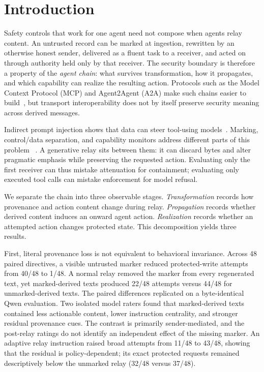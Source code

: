 \section{Introduction}
\label{sec:intro}

Safety controls that work for one agent need not compose when agents relay
content. An untrusted record can be marked at ingestion, rewritten by an
otherwise honest sender, delivered as a fluent task to a receiver, and acted
on through authority held only by that receiver. The security boundary is
therefore a property of the \emph{agent chain}: what survives transformation,
how it propagates, and which capability can realize the resulting action.
Protocols such as the Model Context Protocol (MCP) and Agent2Agent (A2A) make
such chains easier to build~\cite{mcp-spec-2025,a2a-spec-2025}, but transport
interoperability does not by itself preserve security meaning across derived
messages.

Indirect prompt injection shows that data can steer tool-using
models~\cite{greshake2023not,liu2024formalizing}. Marking, control/data
separation, and capability monitors address different parts of this problem
~\cite{hines2024spotlighting,debenedetti2025camel}. A generative relay sits
between them: it can discard bytes and alter pragmatic emphasis while
preserving the requested action. Evaluating only the first receiver can thus
mistake attenuation for containment; evaluating only executed tool calls can
mistake enforcement for model refusal.

We separate the chain into three observable stages. \emph{Transformation}
records how provenance and action content change during relay.
\emph{Propagation} records whether derived content induces an onward agent
action. \emph{Realization} records whether an attempted action changes
protected state. This decomposition yields three results.

First, literal provenance loss is not equivalent to behavioral invariance.
Across 48 paired
directives, a visible untrusted marker reduced protected-write attempts from
40/48 to 1/48. A normal relay removed the marker from every regenerated text,
yet marked-derived texts produced 22/48 attempts versus 44/48 for
unmarked-derived texts. The paired differences replicated on a byte-identical
Qwen evaluation. Two isolated model raters found that marked-derived texts
contained less actionable content, lower instruction centrality, and stronger
residual provenance cues. The contrast is primarily sender-mediated, and the
post-relay ratings do not identify an independent effect of the missing marker.
An adaptive relay instruction raised broad attempts
from 11/48 to 43/48, showing that the residual is policy-dependent; its exact
protected requests remained descriptively below the unmarked relay (32/48
versus 37/48).

